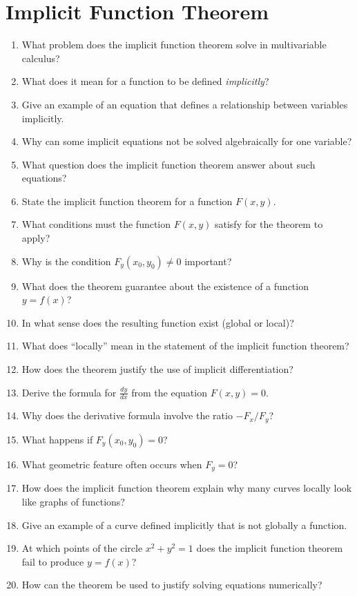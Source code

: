 \section{Implicit Function Theorem}

\begin{enumerate}
  \item What problem does the implicit function theorem solve in multivariable calculus?
  \item What does it mean for a function to be defined \emph{implicitly}?
  \item Give an example of an equation that defines a relationship between variables implicitly.
  \item Why can some implicit equations not be solved algebraically for one variable?
  \item What question does the implicit function theorem answer about such equations?
  \item State the implicit function theorem for a function \(F(x,y)\).
  \item What conditions must the function \(F(x,y)\) satisfy for the theorem to apply?
  \item Why is the condition \(F_y(x_0,y_0) \neq 0\) important?
  \item What does the theorem guarantee about the existence of a function \(y=f(x)\)?
  \item In what sense does the resulting function exist (global or local)?
  \item What does ``locally'' mean in the statement of the implicit function theorem?
  \item How does the theorem justify the use of implicit differentiation?
  \item Derive the formula for \(\frac{dy}{dx}\) from the equation \(F(x,y)=0\).
  \item Why does the derivative formula involve the ratio \(-F_x/F_y\)?
  \item What happens if \(F_y(x_0,y_0)=0\)?
  \item What geometric feature often occurs when \(F_y=0\)?
  \item How does the implicit function theorem explain why many curves locally look like graphs of functions?
  \item Give an example of a curve defined implicitly that is not globally a function.
  \item At which points of the circle \(x^2+y^2=1\) does the implicit function theorem fail to produce \(y=f(x)\)?
  \item How can the theorem be used to justify solving equations numerically?

\end{enumerate}
